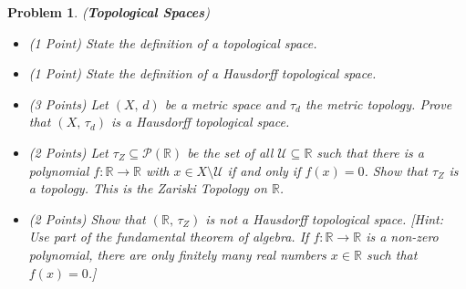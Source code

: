 \documentclass{article}
\theoremstyle{normal}
\newtheorem{problem}{Problem}
\begin{document}
    \begin{problem}
        (\textbf{Topological Spaces})
        \begin{itemize}
            \item (1 Point) State the definition of a topological space.
            \item (1 Point) State the definition of a
                Hausdorff topological space.
            \item (3 Points) Let $(X,\,d)$ be a metric space and $\tau_{d}$ the
                metric topology. Prove that $(X,\,\tau_{d})$ is a Hausdorff
                topological space.
            \item (2 Points) Let $\tau_{Z}\subseteq\mathcal{P}(\mathbb{R})$ be
                the set of all $\mathcal{U}\subseteq\mathbb{R}$ such that
                there is a polynomial $f:\mathbb{R}\rightarrow\mathbb{R}$
                with $x\in{X}\setminus\mathcal{U}$ if and only if
                $f(x)=0$. Show that $\tau_{Z}$ is a topology. This is the
                \textit{Zariski Topology} on $\mathbb{R}$.
            \item (2 Points) Show that $(\mathbb{R},\,\tau_{Z})$ is not
                a Hausdorff topological space. [Hint: Use part of the
                \textit{fundamental theorem of algebra}. If
                $f:\mathbb{R}\rightarrow\mathbb{R}$ is a non-zero polynomial,
                there are only finitely many real numbers $x\in\mathbb{R}$
                such that $f(x)=0$.]
        \end{itemize}
    \end{problem}
\end{document}
